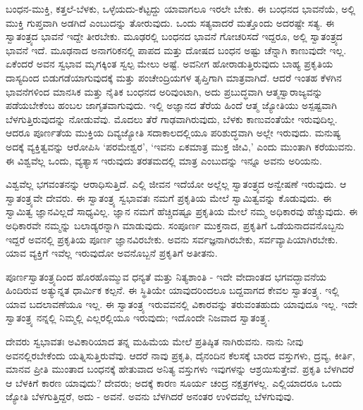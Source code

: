 ಬಂಧನ-ಮುಕ್ತಿ, ಕತ್ತಲೆ-ಬೆಳಕು, ಒಳ್ಳೆಯದು-ಕೆಟ್ಟದ್ದು ಯಾವಾಗಲೂ ಇರಲೇ ಬೇಕು. ಈ ಬಂಧನದ ಭಾವನೆಯೆ, ಅಲ್ಲಿ ಮುಕ್ತಿ ಗುಪ್ತವಾಗಿ ಅಡಗಿದೆ ಎಂಬುದನ್ನು ತೋರುವುದು. ಒಂದು ಸತ್ಯವಾದರೆ ಮತ್ತೊಂದು ಅದರಷ್ಟೇ ಸತ್ಯ. ಈ ಸ್ವಾತಂತ್ರ್ಯದ ಭಾವನೆ ಇದ್ದೇ ತೀರಬೇಕು. ಮೂಢರಲ್ಲಿ ಬಂಧನದ ಭಾವನೆ ಗೋಚರಿಸದೆ ಇದ್ದರೂ, ಅಲ್ಲಿ ಸ್ವಾತಂತ್ರ್ಯದ ಭಾವನೆ ಇದೆ. ಮೂಢನಾದ ಅನಾಗರಿಕನಲ್ಲಿ ಪಾಪದ ಮತ್ತು ದೋಷದ ಬಂಧನ ಅಷ್ಟು ಚೆನ್ನಾಗಿ ಕಾಣುವುದೇ ಇಲ್ಲ. ಏಕೆಂದರೆ ಅವನ ಸ್ವಭಾವ ಮೃಗಕ್ಕಿಂತ ಸ್ವಲ್ಪ ಮೇಲು ಅಷ್ಟೆ. ಅವನೀಗ ಹೋರಾಡುತ್ತಿರುವುದು ಬಾಹ್ಯ ಪ್ರಕೃತಿಯ ದಾಸ್ಯದಿಂದ ಬಿಡುಗಡೆಯಾಗುವುದಕ್ಕೆ ಮತ್ತು ಪಂಚೇಂದ್ರಿಯಗಳ ತೃಪ್ತಿಗಾಗಿ ಮಾತ್ರವಾಗಿದೆ. ಆದರೆ ಇಂತಹ ಕೆಳಗಿನ ಭಾವನೆಗಳಿಂದ ಮಾನಸಿಕ ಮತ್ತು ನೈತಿಕ ಬಂಧನದ ಅರಿವುಂಟಾಗಿ, ಅದು ಪ್ರಬುದ್ಧವಾಗಿ ಆತ್ಮಸ್ವಾರಾಜ್ಯವನ್ನು ಪಡೆಯಬೇಕೆಂಬ ಹಂಬಲ ಜಾಗೃತವಾಗುವುದು. ಇಲ್ಲಿ ಅಜ್ಞಾನದ ತೆರೆಯ ಹಿಂದೆ ಆತ್ಮ ಜ್ಯೋತಿಯು ಅಸ್ಪಷ್ಟವಾಗಿ ಬೆಳಗುತ್ತಿರುವುದನ್ನು ನೋಡುವೆವು. ಮೊದಲು ತೆರೆ ಗಾಢವಾಗಿರುವುದು, ಬೆಳಕು ಕಾಣುವಂತೆಯೇ ಇರುವುದಿಲ್ಲ. ಆದರೂ ಪೂರ್ಣತೆಯ ಮುಕ್ತಿಯ ದಿವ್ಯಜ್ಯೋತಿ ಸದಾಕಾಲದಲ್ಲಿಯೂ ಪರಿಶುದ್ಧವಾಗಿ ಅಲ್ಲೇ ಇರುವುದು. ಮನುಷ್ಯ ಅದಕ್ಕೆ ವ್ಯಕ್ತಿತ್ವವನ್ನು ಆರೋಪಿಸಿ `ಪರಮೇಶ್ವರ', `ಇವನು ಏಕಮಾತ್ರ ಮುಕ್ತ ಜೀವಿ,' ಎಂದು ಮುಂತಾಗಿ ಕರೆಯುವನು. ಈ ವಿಶ್ವವೆಲ್ಲ ಒಂದು, ವ್ಯತ್ಯಾಸ ಇರುವುದು ತರತಮದಲ್ಲಿ ಮಾತ್ರ ಎಂಬುದನ್ನು ಇನ್ನೂ ಅವನು ಅರಿಯನು.

ವಿಶ್ವವೆಲ್ಲ ಭಗವಂತನನ್ನು ಆರಾಧಿಸುತ್ತಿದೆ. ಎಲ್ಲಿ ಜೀವನ ಇದೆಯೋ ಅಲ್ಲೆಲ್ಲ ಸ್ವಾತಂತ್ರ್ಯದ ಅನ್ವೇಷಣೆ ಇರುವುದು. ಆ ಸ್ವಾತಂತ್ರ್ಯವೇ ದೇವರು. ಈ ಸ್ವಾತಂತ್ರ್ಯ ಸ್ವಭಾವತಃ ನಮಗೆ ಪ್ರಕೃತಿಯ ಮೇಲೆ ಸ್ವಾಮಿತ್ವವನ್ನು ಕೊಡುವುದು. ಈ ಸ್ವಾಮಿತ್ವ ಜ್ಞಾನವಿಲ್ಲದೆ ಸಾಧ್ಯವಿಲ್ಲ. ಜ್ಞಾನ ನಮಗೆ ಹೆಚ್ಚಿದಷ್ಟೂ ಪ್ರಕೃತಿಯ ಮೇಲೆ ನಮ್ಮ ಅಧಿಕಾರವು ಹೆಚ್ಚುವುದು. ಈ ಅಧಿಕಾರವೇ ನಮ್ಮನ್ನು ಬಲಾಡ್ಯರನ್ನಾಗಿ ಮಾಡುವುದು. ಸಂಪೂರ್ಣ ಮುಕ್ತನಾದ, ಪ್ರಕೃತಿಗೆ ಒಡೆಯನಾದವನೊಬ್ಬನು ಇದ್ದರೆ ಅವನಲ್ಲಿ ಪ್ರಕೃತಿಯ ಪೂರ್ಣ ಜ್ಞಾನವಿರಬೇಕು. ಅವನು ಸರ್ವಜ್ಞನಾಗಿರಬೇಕು, ಸರ್ವವ್ಯಾಪಿಯಾಗಿರಬೇಕು. ಯಾವ ವ್ಯಕ್ತಿಗೆ ಇವೆಲ್ಲ ಇರುವುದೋ ಅವನೊಬ್ಬನೆ ಪ್ರಕೃತಿಗೆ ಅತೀತನು.

ಪೂರ್ಣಸ್ವಾತಂತ್ರ್ಯದಿಂದ ಹೊರಹೊಮ್ಮುವ ಧನ್ಯತೆ ಮತ್ತು ನಿತ್ಯಶಾಂತಿ - ಇದೇ ವೇದಾಂತದ ಭಗವದ್ಭಾವನೆಯ ಹಿಂದಿರುವ ಅತ್ಯುನ್ನತ ಧಾರ್ಮಿಕ ಕಲ್ಪನೆ. ಈ ಸ್ಥಿತಿಯೇ ಯಾವುದರಿಂದಲೂ ಬದ್ದವಾಗದ ಕೇವಲ ಸ್ವಾತಂತ್ರ್ಯ. ಇಲ್ಲಿ ಯಾವ ಬದಲಾವಣೆಯೂ ಇಲ್ಲ. ಈ ಸ್ವಾತಂತ್ರ್ಯ ಇರುವವನಲ್ಲಿ ವಿಕಾರವನ್ನು ತರುವಂತಹುದು ಯಾವುದೂ ಇಲ್ಲ. ಇದೇ ಸ್ವಾತಂತ್ರ್ಯ ನನ್ನಲ್ಲಿ ನಿಮ್ಮಲ್ಲಿ ಎಲ್ಲರಲ್ಲಿಯೂ ಇರುವುದು; ಇದೊಂದೇ ನಿಜವಾದ ಸ್ವಾತಂತ್ರ್ಯ.

ದೇವರು ಸ್ವಭಾವತಃ ಅವಿಕಾರಿಯಾದ ತನ್ನ ಮಹಿಮೆಯ ಮೇಲೆ ಪ್ರತಿಷ್ಠಿತ ನಾಗಿರುವನು. ನಾನು ನೀವು ಅವನಲ್ಲಿರಬೇಕೆಂದು ಯತ್ನಿಸುತ್ತಿರುವೆವು. ಆದರೆ ನಾವು ಪ್ರಕೃತಿ, ದೈನಂದಿನ ಕೆಲಸಕ್ಕೆ ಬಾರದ ವಸ್ತುಗಳು, ದ್ರವ್ಯ, ಕೀರ್ತಿ, ಮಾನವ ಪ್ರೀತಿ ಮುಂತಾದ ಬಂಧನಕ್ಕೆ ಹೇತುವಾದ ಅನಿತ್ಯ ವಸ್ತುಗಳು ಇವುಗಳನ್ನು ಆಶ್ರಯಿಸುತ್ತೇವೆ. ಪ್ರಕೃತಿ ಬೆಳಗಿದರೆ ಆ ಬೆಳಕಿಗೆ ಕಾರಣ ಯಾವುದು? ದೇವರು; ಅದಕ್ಕೆ ಕಾರಣ ಸೂರ್ಯ ಚಂದ್ರ ನಕ್ಷತ್ರಗಳಲ್ಲ. ಎಲ್ಲಿಯಾದರೂ ಒಂದು ಜ್ಯೋತಿ ಬೆಳಗುತ್ತಿದ್ದರೆ, ಅದು - ಅವನೆ. ಅವನು ಬೆಳಗಿದರೆ ಅನಂತರ ಉಳಿದವೆಲ್ಲ ಬೆಳಗುವುವು.

